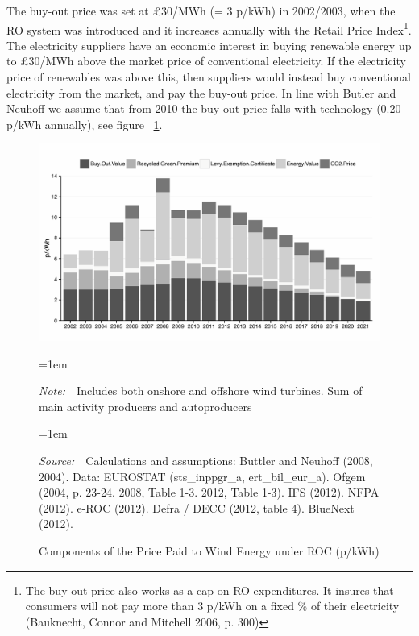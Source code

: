 \documentclass[a4paper, 12pt]{article}
\newcommand{\Figtext}[1]{%
	\begin{tablenotes}[para,flushleft]
		\hangindent=1em
		\footnotesize
		\raggedright
		#1
	\end{tablenotes}
}
\newcommand{\Fignote}[1]{\Figtext{\emph{Note:~}~#1}}
\newcommand{\Figsource}[1]{\Figtext{\emph{Source:~}~#1}}
\begin{document}
The buy-out price was set at £30/MWh (= 3 p/kWh) in 2002/2003, when the RO system was introduced and it increases annually with the Retail Price Index\footnote{The buy-out price also works as a cap on RO expenditures. It insures that consumers will not pay more than 3 p/kWh on a fixed \% of their electricity (Bauknecht, Connor and Mitchell 2006, p. 300)}. The electricity suppliers have an economic interest in buying renewable energy up to £30/MWh above the market price of conventional electricity. If the electricity price of renewables was above this, then suppliers would instead buy conventional electricity from the market, and pay the buy-out price. In line with Butler and Neuhoff we assume that from 2010 the buy-out price falls with technology (0.20 p/kWh annually), see figure ~\ref{fig:figure_roc-price-components}.

\begin{figure}
	\centering
	\caption{Components of the Price Paid to Wind Energy under ROC (p/kWh)}
	\includegraphics[width=1\textwidth]{figure_roc-price-components_gray}
	\Fignote{Includes both onshore and offshore wind turbines. Sum of main activity producers and autoproducers}
	\Figsource{Calculations and assumptions: Buttler and Neuhoff (2008, 2004). Data: EUROSTAT (sts\_inppgr\_a, ert\_bil\_eur\_a). Ofgem (2004, p. 23-24. 2008, Table 1-3. 2012, Table 1-3). IFS (2012). NFPA (2012). e-ROC (2012). Defra / DECC (2012, table 4). BlueNext (2012).}
	\label{fig:figure_roc-price-components}
\end{figure}
\end{document}
